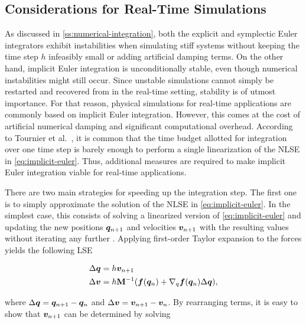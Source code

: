 \subsection{Considerations for Real-Time Simulations}\label{ss:numerical-integration-rt}
As discussed in \cref{ss:numerical-integration}, both the explicit and symplectic Euler integrators exhibit instabilities when simulating
stiff systems without keeping the time step $h$ infeasibly small or adding artificial damping terms. On the other hand, implicit Euler integration
is unconditionally stable, even though numerical instabilities might still occur. Since unstable simulations cannot simply be restarted and 
recovered from in the real-time setting, stability is of utmost importance. For that reason, physical simulations for real-time applications
are commonly based on implicit Euler integration. However, this comes at the cost of artificial numerical damping and significant computational
overhead. According to Tournier et al.\ \cite{tournier2015}, it is common that the time budget allotted for integration over one time step is 
barely enough to perform a single linearization of the NLSE in \cref{eq:implicit-euler}. Thus, additional measures are required to make
implicit Euler integration viable for real-time applications. 

There are two main strategies for speeding up the integration step. The first one is to simply approximate the solution of the NLSE in
\autoref{eq:implicit-euler}. In the simplest case, this consists of solving a linearized version of \autoref{eq:implicit-euler} and updating 
the new positions $\bm{q}_{n+1}$ and velocities $\bm{v}_{n+1}$ with the resulting values without iterating any further \cite{baraff1998}. 
Applying first-order Taylor expansion to the forces yields the following LSE

\begin{equation}\label{eq:linear-implicit-lse}
    \begin{split}
    \Delta \bm{q} &= h \bm{v}_{n+1} \\
    \Delta \bm{v} &= h \mathbf{M}^{-1}(\bm{f}(\bm{q}_n) + \nabla_q \bm{f}(\bm{q}_n) \Delta \bm{q}),
    \end{split}
\end{equation}

\noindent where $\Delta \bm{q} = \bm{q}_{n+1} - \bm{q}_n$ and $\Delta \bm{v} = \bm{v}_{n+1} - \bm{v}_n$. By rearranging terms, it is 
easy to show that $\bm{v}_{n+1}$ can be determined by solving

